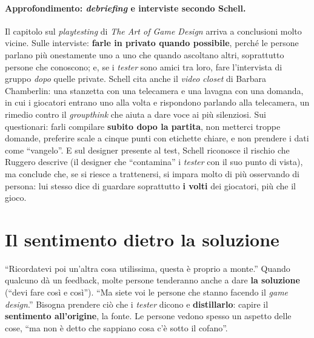 \paragraph{Approfondimento: \emph{debriefing} e interviste secondo Schell.} Il capitolo
sul \emph{playtesting} di \emph{The Art of Game Design} arriva a conclusioni molto
vicine. Sulle interviste: \textbf{farle in privato quando possibile}, perché le persone
parlano più onestamente uno a uno che quando ascoltano altri, soprattutto persone che
conoscono; e, se i \emph{tester} sono amici tra loro, fare l'intervista di gruppo
\emph{dopo} quelle private. Schell cita anche il \emph{video closet} di Barbara
Chamberlin: una stanzetta con una telecamera e una lavagna con una domanda, in cui i
giocatori entrano uno alla volta e rispondono parlando alla telecamera, un rimedio contro
il \emph{groupthink} che aiuta a dare voce ai più silenziosi. Sui questionari: farli
compilare \textbf{subito dopo la partita}, non metterci troppe domande, preferire scale a
cinque punti con etichette chiare, e non prendere i dati come ``vangelo''. E sul
designer presente al test, Schell riconosce il rischio che Ruggero descrive (il designer
che ``contamina'' i \emph{tester} con il suo punto di vista), ma conclude che, se si
riesce a trattenersi, si impara molto di più osservando di persona: lui stesso dice di
guardare soprattutto \textbf{i volti} dei giocatori, più che il gioco.

\section{Il sentimento dietro la soluzione}
\label{a12:sec:sentimento}



``Ricordatevi poi un'altra cosa utilissima, questa è proprio a monte.'' Quando qualcuno dà
un feedback, molte persone tenderanno anche a dare \textbf{la soluzione} (``devi fare
così e così''). ``Ma siete voi le persone che stanno facendo il \emph{game design}.''
Bisogna prendere ciò che i \emph{tester} dicono e \textbf{distillarlo}: capire il
\textbf{sentimento all'origine}, la fonte. Le persone vedono spesso un aspetto delle
cose, ``ma non è detto che sappiano cosa c'è sotto il cofano''.

